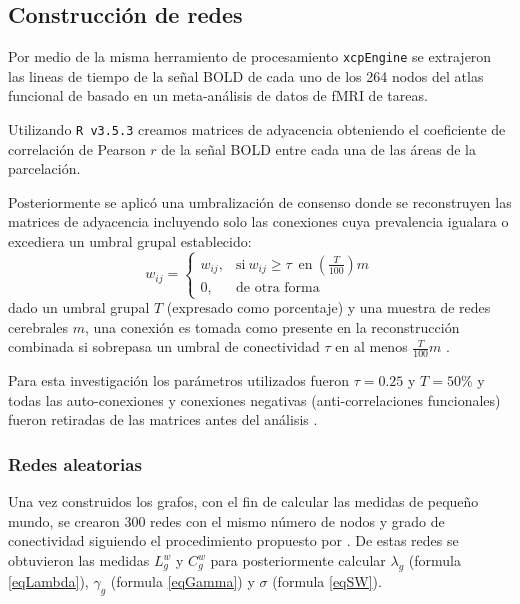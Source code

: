 \subsection{Construcción de redes}
Por medio de la misma herramiento de procesamiento \texttt{xcpEngine} se extrajeron las lineas de tiempo de la señal BOLD de cada uno de los 264 nodos del atlas funcional de \parencite{Power2011} basado en un meta-análisis de datos de fMRI de tareas.\par
Utilizando \texttt{R v3.5.3} \parencite{R2019,Rstudio2018} creamos matrices de  adyacencia obteniendo el coeficiente de correlación de Pearson $r$ de la señal BOLD entre cada una de las áreas de la parcelación.\par
Posteriormente se aplicó una umbralización de consenso donde se reconstruyen las matrices de adyacencia incluyendo solo las conexiones cuya prevalencia igualara o excediera un umbral grupal establecido:
\begin{equation}
    \label{eqn:threshold}
    w_{ij}=
    \begin{cases}
        w_{ij}, & \text{si}\ w_{ij} \geq \tau \enspace \text{en}\ (\frac{T}{100})m \\
        0, & \text{de otra forma}
    \end{cases}
\end{equation}
dado un umbral grupal $T$ (expresado como porcentaje) y una muestra de redes cerebrales $m$, una conexión es tomada como presente en la reconstrucción combinada si sobrepasa un umbral de conectividad $\tau$ en al menos $\frac{T}{100}m$ \parencite{DeReus2013}. \par
Para esta investigación los parámetros utilizados fueron $\tau = 0.25$ y $T = 50\%$ y todas las auto-conexiones y conexiones negativas (anti-correlaciones funcionales) fueron retiradas de las matrices antes del análisis \parencite{Rubinov2010}.

\subsubsection{Redes aleatorias}
Una vez construidos los grafos, con el fin de calcular las medidas de pequeño mundo, se crearon 300 redes con el mismo número de nodos y grado de conectividad siguiendo el procedimiento propuesto por \textcite{Maslov2002}. De estas redes se obtuvieron las medidas $L^w_g$ y $C^w_g$ para posteriormente calcular $\lambda_g$ (formula \ref{eqLambda}), $\gamma_g$ (formula \ref{eqGamma}) y $\sigma$ (formula \ref{eqSW}).

